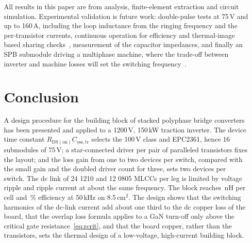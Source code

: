 \documentclass[conference]{IEEEtran}
\begin{document}
All results in this paper are from analysis, finite-element extraction and circuit simulation. Experimental validation is future work: double-pulse tests at 75\,V and up to 160\,A, including the loop inductance from the ringing frequency and the per-transistor currents, continuous operation for efficiency and thermal-image based sharing checks~\cite{cooke2026}, measurement of the capacitor impedances, and finally an SPB submodule driving a multiphase machine, where the trade-off between inverter and machine losses will set the switching frequency~\cite{cooke2024}.

\section{Conclusion}
A design procedure for the building block of stacked polyphase bridge converters has been presented and applied to a 1200\,V, 150\,kW traction inverter. The device time constant $R_\mathrm{DS(on)}C_\mathrm{oss,tr}$ selects the 100\,V class and EPC2361, hence 16 submodules of 75\,V; a star-connected driver per pair of paralleled transistors fixes the layout; and the loss gain from one to two devices per switch, compared with the small gain and the doubled driver count for three, sets two devices per switch. The dc link of 24 1210 and 12 0805 MLCCs per leg is limited by voltage ripple and ripple current at about the same frequency. The block reaches \LloopEsl\,nH per cell and \Eta\,\% efficiency at 50\,kHz on 8.5\,cm$^2$. The design shows that the switching harmonics of the dc-link current add about one third to the dc copper loss of the board, that the overlap loss formula applies to a GaN turn-off only above the critical gate resistance~\eqref{eq:rcrit}, and that the board copper, rather than the transistors, sets the thermal design of a low-voltage, high-current building block.
\end{document}
